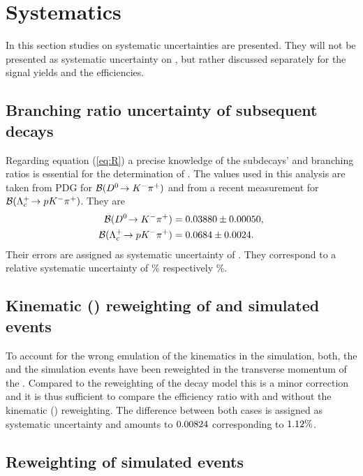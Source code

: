 \chapter{Systematics}
\label{sec:Systematics}
In this section studies on systematic uncertainties are presented.
They will not be presented as systematic uncertainty on \R, but rather discussed separately for the signal yields and the efficiencies.

\section{Branching ratio uncertainty of subsequent decays}
Regarding equation (\ref{eq:R}) a precise knowledge of the subdecays' \DToKpi and \LcTopKpi branching ratios is essential for the determination of \R.
The values used in this analysis are taken from PDG \cite{PDG} for ${\cal B}({{D}^0}\!\rightarrow {\ensuremath{{K}^-}}{\ensuremath{{\pi}^+}})$ and from a recent \belle measurement \cite{Belle_BR_LcTopKpi} for ${\cal B}({{\Lambda}^+_{c}}\!\rightarrow {\ensuremath{p}}{\ensuremath{{K}^-}}{\ensuremath{{\pi}^+}})$.
They are
\begin{align*}
    {\ensuremath{\cal B}}({{D}^0}\!\rightarrow {\ensuremath{{K}^-}}{\ensuremath{{\pi}^+}}) &= 0.03880 \pm 0.00050, \\ 
    {\cal B}({{\Lambda}^+_{c}}\!\rightarrow {\ensuremath{p}}{\ensuremath{{K}^-}}{\ensuremath{{\pi}^+}}) &= 0.0684 \pm 0.0024.
\end{align*}
Their errors are assigned as systematic uncertainty of \R.
They correspond to a relative systematic uncertainty of \SystBRDToKpipercent\% respectively \SystBRLcTopKpipercent\%.

\section{Kinematic \pt(\Lb) reweighting of \LbToDpmunuX and \LbToLcmunu simulated events}
To account for the wrong emulation of the \Lb kinematics in the simulation, both, the \LbToDpmunuX and the \LbToLcmunu simulation events have been reweighted in the transverse momentum of the \Lb.
Compared to the reweighting of the \LbToDpmunuX decay model this is a minor correction and it is thus sufficient to compare the efficiency ratio \effRatio with and without the kinematic \pt(\Lb) reweighting.
The difference between both cases is assigned as systematic uncertainty and amounts to $0.00824$ corresponding to $1.12\%$.

\section{Reweighting of \LbToDpmunuX simulated events}
